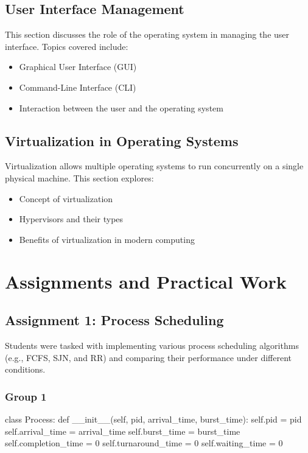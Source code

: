\documentclass[12pt]{article}
\begin{document}
\subsection{User Interface Management}
This section discusses the role of the operating system in managing the user interface. Topics covered include:
\begin{itemize}
    \item Graphical User Interface (GUI)
    \item Command-Line Interface (CLI)
    \item Interaction between the user and the operating system
\end{itemize}

\subsection{Virtualization in Operating Systems}
Virtualization allows multiple operating systems to run concurrently on a single physical machine. This section explores:
\begin{itemize}
    \item Concept of virtualization
    \item Hypervisors and their types
    \item Benefits of virtualization in modern computing
\end{itemize}

\section{Assignments and Practical Work}
\subsection{Assignment 1: Process Scheduling}
Students were tasked with implementing various process scheduling algorithms (e.g., FCFS, SJN, and RR) and comparing their performance under different conditions.
\subsubsection{Group 1}
\begin{python}
    class Process:
    def __init__(self, pid, arrival_time, burst_time):
        self.pid = pid
        self.arrival_time = arrival_time
        self.burst_time = burst_time
        self.completion_time = 0
        self.turnaround_time = 0
        self.waiting_time = 0
\end{python}
\end{document}
